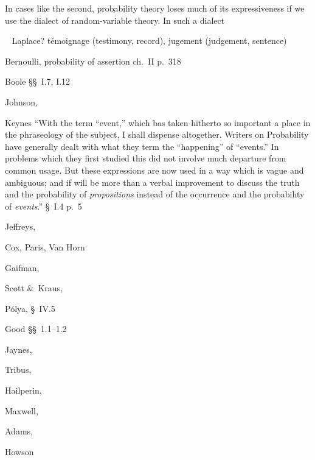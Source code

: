 \documentclass[\ifafour a4paper,12pt,\else a5paper,10pt,\fi%
onecolumn,oneside,article,%
british%
]{memoir}
\theoremstyle{remark}
\theoremstyle{innote}
\newcommand*{\amp}{\&}
\renewcommand*{\|}[1][]{\nonscript\:#1\vert\nonscript\:\mathopen{}}
\renewcommand*{\=}{\TextOrMath\texteq\eq}
\newcommand*{\sect}{\S}%
\newcommand*{\sects}{\S\S}%
\newcommand*{\chap}{ch.}%
\newcommand*{\puzzle}{{\fontencoding{U}\fontfamily{fontawesometwo}\selectfont\symbol{225}}}
\newcommand{\mynote}[1]{ {\color{notecolour}\puzzle\ #1}}
\begin{document}
\bigskip

In cases like the second, probability theory loses much of its
expressiveness if we use the dialect of random-variable theory. In such a dialect



\bigskip









\mynote{
  Laplace? t\'emoignage (testimony, record), jugement (judgement, sentence)
  
Bernoulli, probability of assertion \chap~II p.~318

Boole \sects~I.7, I.12

Johnson,

Keynes \enquote{With the term ``event,'' which bas taken hitherto so important a place in the phraseology of the subject, I shall dispense altogether. Writers on Probability have generally dealt with what they term the ``happening'' of ``events.'' In problems which they first studied this did not involve much departure from common usage. But these expressions are now used in a way which is vague and ambiguous; and if will be more than a verbal improvement to discuss the truth and the probability of \emph{propositions} instead of the occurrence and the probabihty of \emph{events}.} \sect~I.4 p.~5

Jeffreys,

Cox, Paris, Van Horn

Gaifman,

Scott \amp\ Kraus,

P\'olya, \sect~IV.5

Good \sects~1.1--1.2

Jaynes,

Tribus,

Hailperin,

Maxwell,

Adams,

Howson
}

\end{document}
